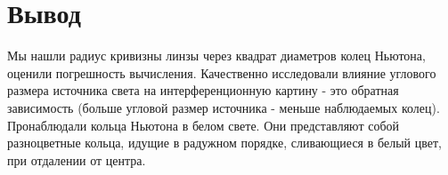 \section{Вывод}

Мы нашли радиус кривизны линзы через квадрат диаметров колец Ньютона, оценили погрешность вычисления. Качественно исследовали влияние углового размера источника света на интерференционную картину - это обратная зависимость (больше угловой размер источника - меньше наблюдаемых колец). Пронаблюдали кольца Ньютона в белом свете. Они представляют собой разноцветные кольца, идущие в радужном порядке, сливающиеся в белый цвет, при отдалении от центра.